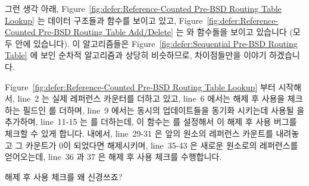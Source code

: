 그런 생각 아래,
Figure~\ref{fig:defer:Reference-Counted Pre-BSD Routing Table Lookup}
는 데이터 구조들과  함수를 보이고 있고,
Figure~\ref{fig:defer:Reference-Counted Pre-BSD Routing Table Add/Delete}
는  와  함수들을 보이고 있습니다 (모두
 안에 있습니다).
이 알고리즘들은
Figure~\ref{fig:defer:Sequential Pre-BSD Routing Table} 에 보인 순차적
알고리즘과 상당히 비슷하므로, 차이점들만을 이야기 하겠습니다.

Figure~\ref{fig:defer:Reference-Counted Pre-BSD Routing Table Lookup} 부터
시작해서, line~2 는 실제 레퍼런스 카운터를 더하고 있고, line~6 에서는 해제 후
사용을 체크하는 필드인  를 더하며, line~9 에서는 동시의
업데이트들을 동기화 시키는데 사용될  을 추가하며, line~11-15 는
 를 더하는데, 이 함수는  를 설정해서
 이 해제 후 사용 버그를 체크할 수 있게 합니다.
 내에서, line~29-31 은 앞의 원소의 레퍼런스 카운트를
내려놓고 그 카운트가 0이 되었다면 해제시키며, line~35-43 은 새로운 원소로의
레퍼런스를 얻어오는데, line~36 과 37 은 해제 후 사용 체크를 수행합니다.

\QuickQuiz{}
	해제 후 사용 체크를 왜 신경쓰죠?
	\iffalse

